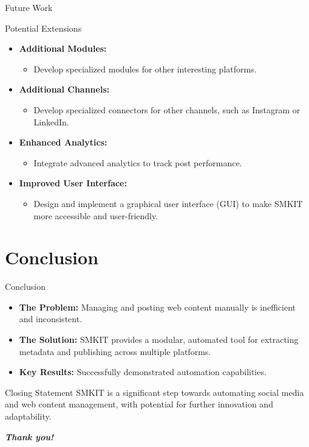 \documentclass{beamer}
\begin{document}
    \begin{frame}{Future Work}
        \begin{exampleblock}{Potential Extensions}
            \begin{itemize}
                \item \textbf{Additional Modules:}
                    \begin{itemize}
                        \item Develop specialized modules for other interesting platforms.
                    \end{itemize}
                \item \textbf{Additional Channels:}
                    \begin{itemize}
                        \item Develop specialized connectors for other channels, such as Instagram or LinkedIn.
                    \end{itemize}
                \item \textbf{Enhanced Analytics:}
                    \begin{itemize}
                        \item Integrate advanced analytics to track post performance.
                    \end{itemize}
                \item \textbf{Improved User Interface:}
                    \begin{itemize}
                        \item Design and implement a graphical user interface (GUI) to make SMKIT more accessible and user-friendly.
                    \end{itemize}
            \end{itemize}
        \end{exampleblock}
    \end{frame}


\section{Conclusion}
    \begin{frame}{Conclusion}
        \begin{itemize}
            \item \textbf{The Problem:}
                Managing and posting web content manually is inefficient and inconsistent.
            \item \textbf{The Solution:}
                SMKIT provides a modular, automated tool for extracting metadata and publishing across multiple platforms.
            \item \textbf{Key Results:} Successfully demonstrated automation capabilities.
        \end{itemize}

        \begin{block}{Closing Statement}
            SMKIT is a significant step towards automating social media and web content management, with potential for further innovation and adaptability.
        \end{block}
    \end{frame}


\begin{emptyframe}
     \textbf{ \textit{Thank you!} }
\end{emptyframe}

\appendix
    
\end{document}
